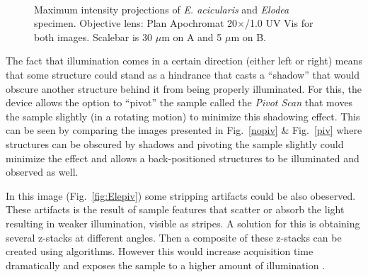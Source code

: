 \begin{figure}[h!]
\centering
{}\hspace{0.1mm}
\\
\caption{Maximum intensity projections of \textit{E. acicularis} and \textit{Elodea} specimen. 
Objective lens: Plan Apochromat 20$\times$/1.0 UV Vis for both images. 
Scalebar is 30 $\mu$m on A and 5 $\mu$m on B.}
\label{fig:EEmip}
\end{figure}

The fact that illumination comes in a certain direction (either left or right) means that some structure could stand as a hindrance that casts a ``shadow'' that would obscure another structure behind it from being properly illuminated. 
For this, the device allows the option to ``pivot'' the sample called the \textit{Pivot Scan} that moves the sample slightly (in a rotating motion) to minimize this shadowing effect. 
This can be seen by comparing the images presented in Fig.~\ref{nopiv} \& Fig.~\ref{piv} where structures can be obscured by shadows and pivoting the sample slightly could minimize the effect and allows a back-positioned structures to be illuminated and observed as well.

In this image (Fig.~\ref{fig:Elepiv}) some stripping artifacts could be also obeserved. 
These artifacts is the result of sample features that scatter or absorb the light resulting in weaker illumination, visible as stripes. 
A solution for this is obtaining several z-stacks at different angles. 
Then a composite of these z-stacks can be created using algorithms. 
However this would increase acquisition time dramatically and exposes the sample to a higher amount of illumination \cite{NikonLS}. 

